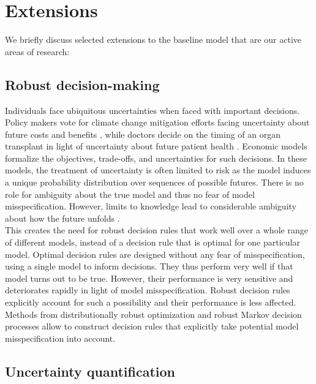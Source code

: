 \section{Extensions}\label{Extensions}
We briefly discuss selected extensions to the baseline model that are our active areas of research:

\subsection{Robust decision-making} Individuals face ubiquitous uncertainties when faced with important decisions. Policy makers vote for climate change mitigation efforts facing uncertainty about future costs and benefits \citep{Barnett.2019}, while doctors decide on the timing of an organ transplant
in light of uncertainty about future patient health \citep{Kaufman.2017}. Economic models formalize the objectives, trade-offs, and uncertainties for such decisions. In these models, the treatment of uncertainty is often limited to risk as the model induces a unique probability distribution over sequences of possible futures. There is no role for ambiguity about the true model \citep{Knight.1921,Arrow.1951} and thus no fear of model misspecification. However, limits to knowledge lead to considerable ambiguity about how the future unfolds \citep{Hayek.1975,Hansen.2015}.\\

This creates the need for robust decision rules that work well over a whole range of different
models, instead of a decision rule that is optimal for one particular model. Optimal decision rules are designed without any fear of misspecification, using a single model to inform decisions. They thus perform
very well if that model turns out to be true. However, their performance is very sensitive and
deteriorates rapidly in light of model misspecification. Robust decision rules explicitly account
for such a possibility and their performance is less affected.\\

Methods from distributionally robust optimization \citep{Ben-Tal.2009,Wiesemann.2014,Rahimian.2019} and robust Markov decision processes \citep{Iyengar.2005,Nilim.2005,Wiesemann.2014} allow to construct decision rules that explicitly take potential model misspecification into account.

\subsection{Uncertainty quantification}

